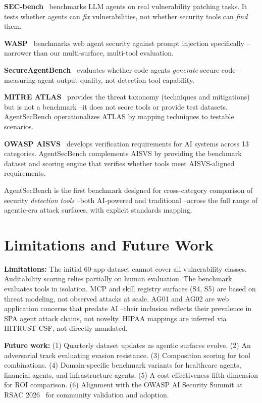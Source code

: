 \documentclass[11pt,twocolumn]{article}
\begin{document}
\textbf{SEC-bench}~\cite{secbench2025} benchmarks LLM agents on real vulnerability patching tasks. It tests whether agents can \textit{fix} vulnerabilities, not whether security tools can \textit{find} them.

\textbf{WASP}~\cite{wasp2025} benchmarks web agent security against prompt injection specifically --narrower than our multi-surface, multi-tool evaluation.

\textbf{SecureAgentBench}~\cite{secureagentbench2025} evaluates whether code agents \textit{generate} secure code --measuring agent output quality, not detection tool capability.

\textbf{MITRE ATLAS}~\cite{atlas2026} provides the threat taxonomy (techniques and mitigations) but is not a benchmark --it does not score tools or provide test datasets. AgentSecBench operationalizes ATLAS by mapping techniques to testable scenarios.

\textbf{OWASP AISVS}~\cite{aisvs2026} develops verification requirements for AI systems across 13 categories. AgentSecBench complements AISVS by providing the benchmark dataset and scoring engine that verifies whether tools meet AISVS-aligned requirements.

AgentSecBench is the first benchmark designed for cross-category comparison of security \textit{detection tools} --both AI-powered and traditional --across the full range of agentic-era attack surfaces, with explicit standards mapping.

\section{Limitations and Future Work}

\textbf{Limitations:} The initial 60-app dataset cannot cover all vulnerability classes. Auditability scoring relies partially on human evaluation. The benchmark evaluates tools in isolation. MCP and skill registry surfaces (S4, S5) are based on threat modeling, not observed attacks at scale. AG01 and AG02 are web application concerns that predate AI --their inclusion reflects their prevalence in SPA agent attack chains, not novelty. HIPAA mappings are inferred via HITRUST CSF, not directly mandated.

\textbf{Future work:} (1) Quarterly dataset updates as agentic surfaces evolve. (2) An adversarial track evaluating evasion resistance. (3) Composition scoring for tool combinations. (4) Domain-specific benchmark variants for healthcare agents, financial agents, and infrastructure agents. (5) A cost-effectiveness fifth dimension for ROI comparison. (6) Alignment with the OWASP AI Security Summit at RSAC 2026~\cite{rsac2026} for community validation and adoption.
\end{document}
